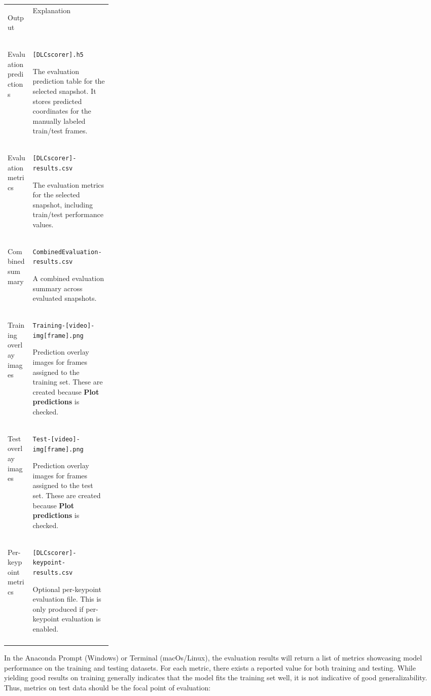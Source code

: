\documentclass[11pt]{article}
\newif\ifalmaoutputtable
\newcommand{\boxedtoprule}{%
  \ifalmaoutputtable
    \arrayrulecolor{calloutOutputFrame}\hline\rowcolor{calloutOutputHeader}%
  \else
    \arrayrulecolor{almaBlue!62}\hline\rowcolor{almaSky!78}%
  \fi
}
\newcommand{\boxedmidrule}{%
  \ifalmaoutputtable
    \arrayrulecolor{calloutOutputFrame}\hline
  \else
    \arrayrulecolor{calloutDataFrame}\hline
  \fi
}
\newcommand{\boxedbottomrule}{%
  \ifalmaoutputtable
    \arrayrulecolor{calloutOutputFrame}\hline
  \else
    \arrayrulecolor{almaBlue!62}\hline
  \fi
}
\renewcommand{\[}{%
  \par\smallskip\noindent
  \begin{center}%
  \setlength{\fboxsep}{5pt}%
  \setlength{\fboxrule}{0.35pt}%
  \begin{lrbox}{\almaEquationBox}%
  $\displaystyle
}
\renewcommand{\]}{%
  $%
  \end{lrbox}%
  \fcolorbox{equationLine}{equationBack}{\usebox{\almaEquationBox}}%
  \end{center}%
  \smallskip\par
}
\begin{document}
\begin{tcolorbox}[output file box,title=\textbf{Evaluate Network Output Files}]
\begin{tabularx}{\linewidth}{
>{\bfseries\raggedright\arraybackslash}p{0.24\linewidth}|
>{\raggedright\arraybackslash}X
}
\boxedtoprule
Output & Explanation \\
\boxedmidrule
Evaluation predictions & \texttt{[DLCscorer].h5}\par
The evaluation prediction table for the selected snapshot. It stores predicted coordinates for the manually labeled train/test frames. \\
Evaluation metrics & \texttt{[DLCscorer]-results.csv}\par
The evaluation metrics for the selected snapshot, including train/test performance values. \\
Combined summary & \texttt{CombinedEvaluation-results.csv}\par
A combined evaluation summary across evaluated snapshots. \\
Training overlay images & \texttt{Training-[video]-img[frame].png}\par
Prediction overlay images for frames assigned to the training set. These are created because \textbf{Plot predictions} is checked. \\
Test overlay images & \texttt{Test-[video]-img[frame].png}\par
Prediction overlay images for frames assigned to the test set. These are created because \textbf{Plot predictions} is checked. \\
Per-keypoint metrics & \texttt{[DLCscorer]-keypoint-results.csv}\par
Optional per-keypoint evaluation file. This is only produced if per-keypoint evaluation is enabled. \\
\boxedbottomrule
\end{tabularx}
\end{tcolorbox}

In the Anaconda Prompt (Windows) or Terminal (macOs/Linux), the evaluation results will return a list of metrics showcasing model performance on the training and testing datasets. For each metric, there exists a reported value for both training and testing. While yielding good results on training generally indicates that the model fits the training set well, it is not indicative of good generalizability. Thus, metrics on test data should be the focal point of evaluation:
\end{document}
